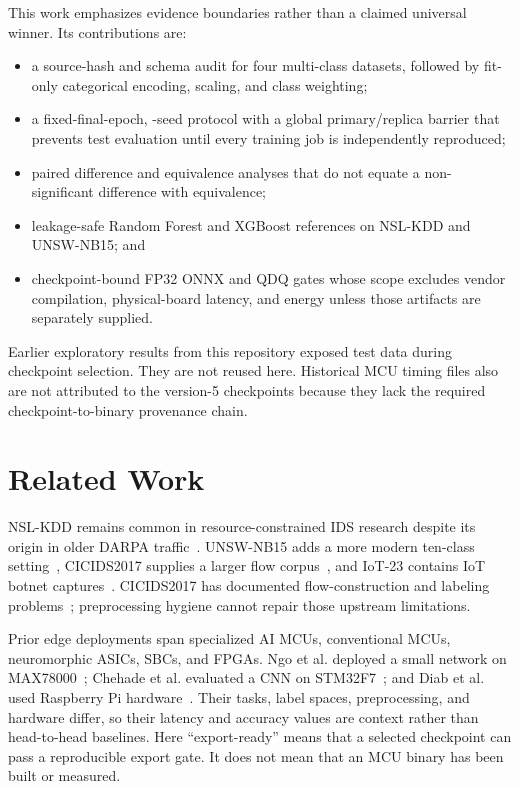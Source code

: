 \documentclass[10pt,conference]{IEEEtran}
\begin{document}
This work emphasizes evidence boundaries rather than a claimed universal
winner. Its contributions are:

\begin{itemize}
  \item a source-hash and schema audit for four multi-class datasets, followed
  by fit-only categorical encoding, scaling, and class weighting;
  \item a fixed-final-epoch, \vFiveSeeds-seed protocol with a global
  primary/replica barrier that prevents test evaluation until every training
  job is independently reproduced;
  \item paired difference and equivalence analyses that do not equate a
  non-significant difference with equivalence;
  \item leakage-safe Random Forest and XGBoost references on NSL-KDD and
  UNSW-NB15; and
  \item checkpoint-bound FP32 ONNX and QDQ gates whose scope excludes vendor
  compilation, physical-board latency, and energy unless those artifacts are
  separately supplied.
\end{itemize}

Earlier exploratory results from this repository exposed test data during
checkpoint selection. They are not reused here. Historical MCU timing files
also are not attributed to the version-5 checkpoints because they lack the
required checkpoint-to-binary provenance chain.

\section{Related Work}

NSL-KDD remains common in resource-constrained IDS research despite its origin
in older DARPA traffic~\cite{tavallaee2009nslkdd}. UNSW-NB15 adds a more
modern ten-class setting~\cite{moustafa2015unsw}, CICIDS2017 supplies a larger
flow corpus~\cite{sharafaldin2018cicids}, and IoT-23 contains IoT botnet
captures~\cite{garcia2020iot23}. CICIDS2017 has documented flow-construction
and labeling problems~\cite{engelen2021cicids}; preprocessing hygiene cannot
repair those upstream limitations.

Prior edge deployments span specialized AI MCUs, conventional MCUs,
neuromorphic ASICs, SBCs, and FPGAs. Ngo et al. deployed a small network on
MAX78000~\cite{ngo2023hhnids}; Chehade et al. evaluated a CNN on
STM32F7~\cite{chehade2025stm32}; and Diab et al. used Raspberry Pi
hardware~\cite{diab2025rpi}. Their tasks, label spaces, preprocessing, and
hardware differ, so their latency and accuracy values are context rather than
head-to-head baselines. Here ``export-ready'' means that a selected
checkpoint can pass a reproducible export gate. It does not mean that an MCU
binary has been built or measured.
\end{document}
